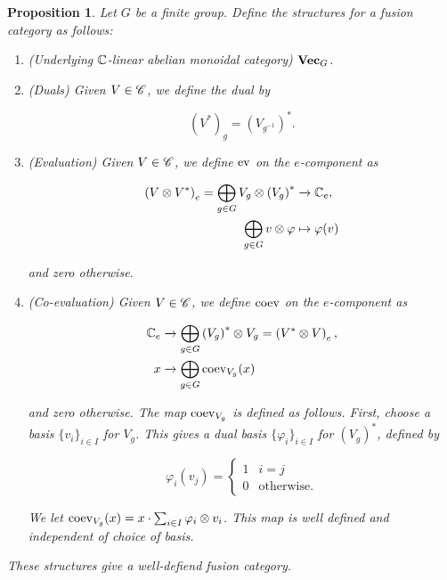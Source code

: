 \documentclass{article}
\newtheorem{proposition}{Proposition}[section]
\theoremstyle{definition}
\numberwithin{figure}{section}
\begin{document}
\begin{proposition} Let $G$ be a finite group. Define the structures for a fusion category as follows:

\begin{enumerate}
\item (Underlying $\mathbb{C}$-linear abelian monoidal category) $\bold{Vec}_G$.
\item (Duals) Given $V\in \mathscr{C}$, we define the dual by

$$\left(V^*\right)_g= \left(V_{g^{-1}}\right)^*.$$

\item (Evaluation) Given $V\in \mathscr{C}$, we define $\mathrm{ev}$ on the $e$-component as

\begin{align*}
\left(V\otimes V^*\right)_e=\bigoplus_{g\in G}V_g\otimes \left(V_g\right)^*&\xrightarrow{} \mathbb{C}_e,\\
\bigoplus_{g\in G}v\otimes \varphi & \mapsto \varphi(v)
\end{align*}

and zero otherwise.

\item (Co-evaluation) Given $V\in \mathscr{C}$, we define $\mathrm{coev}$ on the $e$-component as

\begin{align*}
\mathbb{C}_e&\xrightarrow{}\bigoplus_{g\in G}\left(V_g\right)^*\otimes V_g=\left(V^*\otimes V\right)_e,\\
x&\xrightarrow{} \bigoplus_{g\in G}\mathrm{coev}_{V_g}(x)
\end{align*}

and zero otherwise. The map $\mathrm{coev}_{V_g}$ is defined as follows. First, choose a basis $\{v_i\}_{i\in I}$ for $V_g$. This gives a dual basis $\{\varphi_i\}_{i\in I}$ for $\left(V_g\right)^*$, defined by

$$\varphi_i(v_j)=
\begin{cases}
1 & i=j\\
0 & \text{otherwise.}
\end{cases}$$

We let $\mathrm{coev}_{V_g}(x)=x\cdot \sum_{i\in I}\varphi_i\otimes v_i$. This map is well defined and independent of choice of basis.
\end{enumerate}

These structures give a well-defiend fusion category.
\end{proposition}
\end{document}
